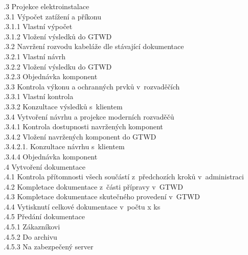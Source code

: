 \documentclass[a4paper, twoside, 11pt]{article}
\begin{document}
			
		\indent {}.3 Projekce elektroinstalace\\
			\indent \indent {}.3.1 Výpočet zatížení a příkonu\\
				\indent \indent \indent {}.3.1.1 Vlastní výpočet\\
				\indent \indent \indent {}.3.1.2 Vložení výsledků do GTWD\\
			\indent \indent {}.3.2 Navržení rozvodu kabeláže dle stávající dokumentace\\
				\indent \indent \indent {}.3.2.1 Vlastní návrh\\
				\indent \indent \indent {}.3.2.2 Vložení výsledku do GTWD\\
				\indent \indent \indent {}.3.2.3 Objednávka komponent\\
			\indent \indent {}.3.3 Kontrola výkonu a ochranných prvků v~rozvaděčích\\
				\indent \indent \indent {}.3.3.1 Vlastní kontrola\\
			\indent \indent \indent {}.3.3.2 Konzultace výsledků s~klientem\\
			\indent \indent {}.3.4 Vytvoření návrhu a projekce moderních rozvaděčů\\
				\indent \indent \indent {}.3.4.1 Kontrola dostupnosti navržených komponent\\
				\indent \indent \indent {}.3.4.2 Vložení navržených komponent do GTWD\\
				\indent \indent \indent \indent {}.3.4.2.1. Konzultace návrhu s~klientem\\
				\indent \indent \indent {}.3.4.4 Objednávka komponent\\

		\indent \indent {}.4 Vytvoření dokumentace\\
			\indent \indent {}.4.1 Kontrola přítomnosti všech součástí z~předchozích kroků v~administraci\\
			\indent \indent {}.4.2 Kompletace dokumentace z~části přípravy v~GTWD\\
			\indent \indent {}.4.3 Kompletace dokumentace skutečného provedení v~GTWD\\
			\indent \indent {}.4.4 Vytisknutí celkové dokumentace v~počtu x ks\\
			\indent \indent {}.4.5 Předání dokumentace\\
				\indent \indent \indent {}.4.5.1 Zákazníkovi\\
				\indent \indent \indent {}.4.5.2 Do archivu\\
				\indent \indent \indent {}.4.5.3 Na zabezpečený server\\
\end{document}
